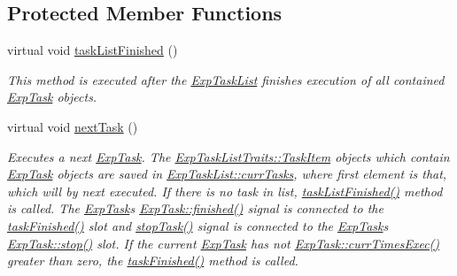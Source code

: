 \subsection*{Protected Member Functions}
\begin{DoxyCompactItemize}
\item 
virtual void \hyperlink{class_exp_task_list_adee3f2e0894b5b102b2fcf0cff4ff25a}{task\+List\+Finished} ()
\begin{DoxyCompactList}\small\item\em This method is executed after the \hyperlink{class_exp_task_list}{Exp\+Task\+List} finishes execution of all contained \hyperlink{class_exp_task}{Exp\+Task} objects. \end{DoxyCompactList}\item 
\hypertarget{class_exp_task_list_a2aa559b46e0fa585386fdf209ab2f366}{}virtual void \hyperlink{class_exp_task_list_a2aa559b46e0fa585386fdf209ab2f366}{next\+Task} ()\label{class_exp_task_list_a2aa559b46e0fa585386fdf209ab2f366}

\begin{DoxyCompactList}\small\item\em Executes a next \hyperlink{class_exp_task}{Exp\+Task}. The \hyperlink{struct_exp_task_list_traits_1_1_task_item}{Exp\+Task\+List\+Traits\+::\+Task\+Item} objects which contain \hyperlink{class_exp_task}{Exp\+Task} objects are saved in \hyperlink{class_exp_task_list_abfeadd157333249e79ee8ff98ba98cf2}{Exp\+Task\+List\+::curr\+Tasks}, where first element is that, which will by next executed. If there is no task in list, \hyperlink{class_exp_task_list_adee3f2e0894b5b102b2fcf0cff4ff25a}{task\+List\+Finished()} method is called. The \hyperlink{class_exp_task}{Exp\+Task}\textquotesingle{}s \hyperlink{class_exp_task_aeb51d072a7b96f55da3738a8c7733611}{Exp\+Task\+::finished()} signal is connected to the \hyperlink{class_exp_task_list_afba27c0ec9da9a87cea6a15fc5a2beca}{task\+Finished()} slot and \hyperlink{class_exp_task_list_a445b0e774f24ebcd351ef5121d7f9487}{stop\+Task()} signal is connected to the \hyperlink{class_exp_task}{Exp\+Task}\textquotesingle{}s \hyperlink{class_exp_task_a22f581786f11fa3c7dc52ff90c6b7043}{Exp\+Task\+::stop()} slot. If the current \hyperlink{class_exp_task}{Exp\+Task} has not \hyperlink{class_exp_task_a1ab988b6d9eb6d61cd1b3ac1a1c42153}{Exp\+Task\+::curr\+Times\+Exec()} greater than zero, the \hyperlink{class_exp_task_list_afba27c0ec9da9a87cea6a15fc5a2beca}{task\+Finished()} method is called. \end{DoxyCompactList}\end{DoxyCompactItemize}
